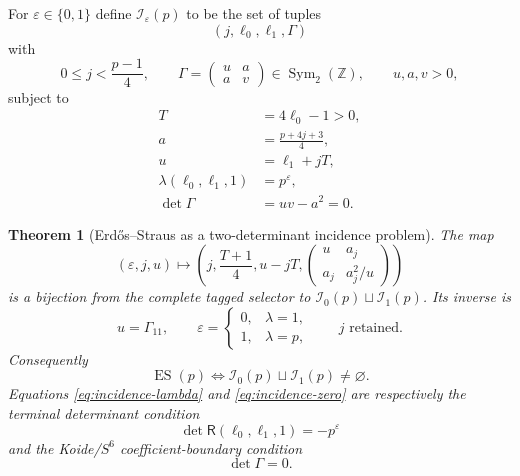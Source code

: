 \documentclass[11pt]{article}
\newtheorem{theorem}{Theorem}[section]
\theoremstyle{definition}
\theoremstyle{remark}
\newcommand{\Z}{\mathbb Z}
\newcommand{\Sym}{\operatorname{Sym}}
\newcommand{\ES}{\operatorname{ES}}
\begin{document}
For $\varepsilon\in\{0,1\}$ define $\mathscr I_\varepsilon(p)$ to be the set
of tuples
\begin{equation}\label{eq:incidence-tuple}
 (j,\ell_0,\ell_1,\Gamma)
\end{equation}
with
\begin{equation}\label{eq:incidence-range}
 0\le j<\frac{p-1}{4},
 \qquad
 \Gamma=\begin{pmatrix}u&a\\a&v\end{pmatrix}
 \in\Sym_2(\Z),
 \qquad u,a,v>0,
\end{equation}
subject to
\begin{align}
 T&=4\ell_0-1>0,\label{eq:incidence-T}\\
 a&=\frac{p+4j+3}{4},\label{eq:incidence-a}\\
 u&=\ell_1+jT,\label{eq:incidence-u}\\
 \lambda(\ell_0,\ell_1,1)&=p^\varepsilon,\label{eq:incidence-lambda}\\
 \det\Gamma&=uv-a^2=0.\label{eq:incidence-zero}
\end{align}

\begin{theorem}[Erd\H{o}s--Straus as a two-determinant incidence problem]
\label{thm:incidence}
The map
\begin{equation}\label{eq:incidence-map}
 (\varepsilon,j,u)
 \longmapsto
 \left(j,\frac{T+1}{4},u-jT,
 \begin{pmatrix}u&a_j\\a_j&a_j^2/u\end{pmatrix}\right)
\end{equation}
is a bijection from the complete tagged selector to
$\mathscr I_0(p)\sqcup\mathscr I_1(p)$.  Its inverse is
\begin{equation}\label{eq:incidence-inverse}
 u=\Gamma_{11},
 \qquad
 \varepsilon=
 \begin{cases}
 0,&\lambda=1,\\
 1,&\lambda=p,
 \end{cases}
 \qquad
 j\text{ retained}.
\end{equation}
Consequently
\begin{equation}\label{eq:ES-incidence}
 \boxed{\ES(p)\Longleftrightarrow
 \mathscr I_0(p)\sqcup\mathscr I_1(p)\ne\varnothing.}
\end{equation}
Equations \eqref{eq:incidence-lambda} and \eqref{eq:incidence-zero} are
respectively the terminal determinant condition
\begin{equation}\label{eq:two-dets-1}
 \det\mathsf R(\ell_0,\ell_1,1)=-p^\varepsilon
\end{equation}
and the Koide/$S^6$ coefficient-boundary condition
\begin{equation}\label{eq:two-dets-2}
 \det\Gamma=0.
\end{equation}
\end{theorem}
\end{document}
